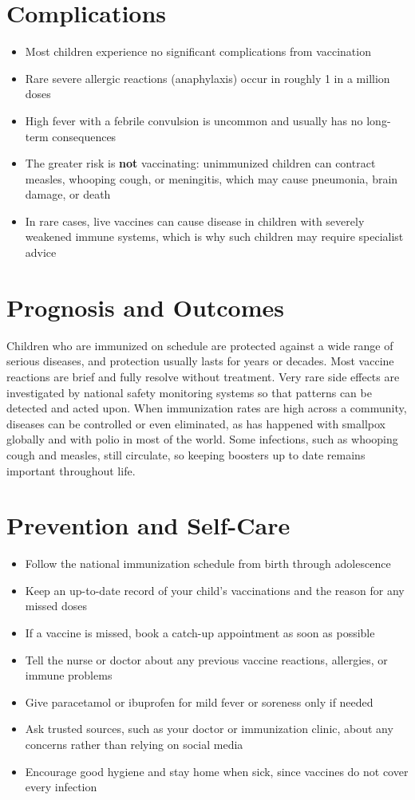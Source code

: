 \section*{Complications}
\begin{itemize}
    \item Most children experience no significant complications from vaccination
    \item Rare severe allergic reactions (anaphylaxis) occur in roughly 1 in a million doses
    \item High fever with a febrile convulsion is uncommon and usually has no long-term consequences
    \item The greater risk is \textbf{not} vaccinating: unimmunized children can contract measles, whooping cough, or meningitis, which may cause pneumonia, brain damage, or death
    \item In rare cases, live vaccines can cause disease in children with severely weakened immune systems, which is why such children may require specialist advice
\end{itemize}

\section*{Prognosis and Outcomes}
Children who are immunized on schedule are protected against a wide range of serious diseases, and protection usually lasts for years or decades. Most vaccine reactions are brief and fully resolve without treatment. Very rare side effects are investigated by national safety monitoring systems so that patterns can be detected and acted upon. When immunization rates are high across a community, diseases can be controlled or even eliminated, as has happened with smallpox globally and with polio in most of the world. Some infections, such as whooping cough and measles, still circulate, so keeping boosters up to date remains important throughout life.

\section*{Prevention and Self-Care}
\begin{itemize}
    \item Follow the national immunization schedule from birth through adolescence
    \item Keep an up-to-date record of your child's vaccinations and the reason for any missed doses
    \item If a vaccine is missed, book a catch-up appointment as soon as possible
    \item Tell the nurse or doctor about any previous vaccine reactions, allergies, or immune problems
    \item Give paracetamol or ibuprofen for mild fever or soreness only if needed
    \item Ask trusted sources, such as your doctor or immunization clinic, about any concerns rather than relying on social media
    \item Encourage good hygiene and stay home when sick, since vaccines do not cover every infection
\end{itemize}

